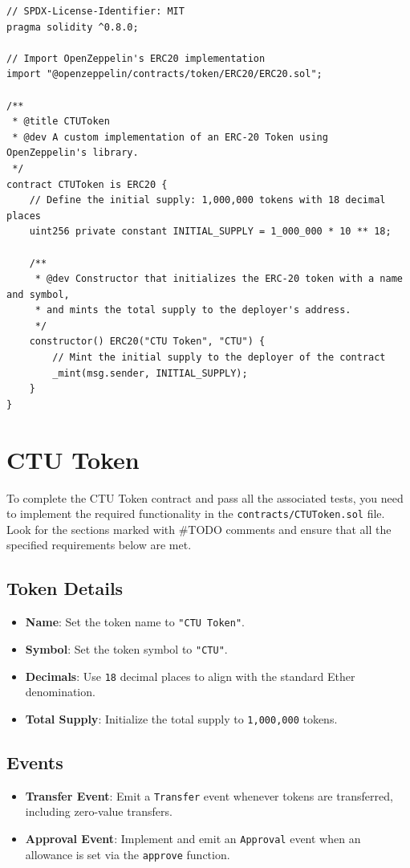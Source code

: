 \documentclass[12pt]{article}
\begin{document}
\noindent
\begin{minipage}{\textwidth}
\begin{lstlisting}[language=Solidity]
// SPDX-License-Identifier: MIT
pragma solidity ^0.8.0;

// Import OpenZeppelin's ERC20 implementation
import "@openzeppelin/contracts/token/ERC20/ERC20.sol";

/**
 * @title CTUToken
 * @dev A custom implementation of an ERC-20 Token using OpenZeppelin's library.
 */
contract CTUToken is ERC20 {
    // Define the initial supply: 1,000,000 tokens with 18 decimal places
    uint256 private constant INITIAL_SUPPLY = 1_000_000 * 10 ** 18;

    /**
     * @dev Constructor that initializes the ERC-20 token with a name and symbol,
     * and mints the total supply to the deployer's address.
     */
    constructor() ERC20("CTU Token", "CTU") {
        // Mint the initial supply to the deployer of the contract
        _mint(msg.sender, INITIAL_SUPPLY);
    }
}
\end{lstlisting}
\end{minipage}

\section{CTU Token}

To complete the CTU Token contract and pass all the associated tests, you need to implement the required functionality in the \texttt{contracts/CTUToken.sol} file. Look for the sections marked with \#TODO comments and ensure that all the specified requirements below are met.

\subsection*{Token Details}
\begin{itemize}
  \item \textbf{Name}: Set the token name to \texttt{"CTU Token"}.
  \item \textbf{Symbol}: Set the token symbol to \texttt{"CTU"}.
  \item \textbf{Decimals}: Use \texttt{18} decimal places to align with the standard Ether denomination.
  \item \textbf{Total Supply}: Initialize the total supply to \texttt{1,000,000} tokens.
\end{itemize}

\subsection*{Events}
\begin{itemize}
  \item \textbf{Transfer Event}: Emit a \texttt{Transfer} event whenever tokens are transferred, including zero-value transfers.
  \item \textbf{Approval Event}: Implement and emit an \texttt{Approval} event when an allowance is set via the \texttt{approve} function.
\end{itemize}
\end{document}
